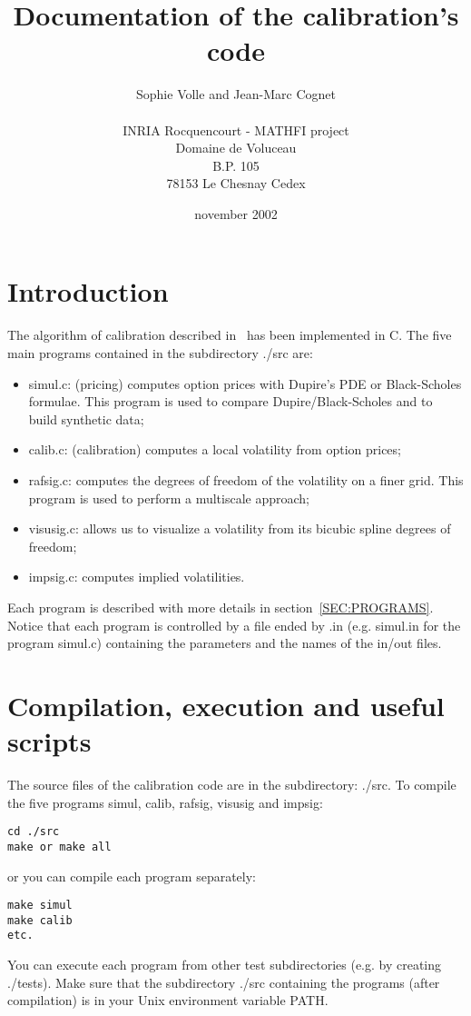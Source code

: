 \documentclass[12pt]{article}
\title{Documentation of the calibration's code}
\author{Sophie Volle and Jean-Marc Cognet \\ \\
INRIA Rocquencourt - MATHFI project \\ 
Domaine de Voluceau \\ 
B.P. 105 \\
78153 Le Chesnay Cedex}
\date{november 2002}
\begin{document}
\maketitle

\tableofcontents
\clearpage

\section{Introduction}

The algorithm of calibration described in~\cite{bcv:inria:02} has 
been implemented in C. The five main programs contained in the 
subdirectory ./src are:
\begin{itemize}
\item 
simul.c: (pricing) computes option prices with Dupire's PDE or 
Black-Scholes formulae. This program is used to compare 
Dupire/Black-Scholes and to build synthetic data;
\item
calib.c: (calibration) computes a local volatility from option 
prices;
\item
rafsig.c: computes the degrees of freedom of the volatility on a finer 
grid. This program is used to perform a multiscale approach;
\item
visusig.c: allows us to visualize a volatility from its bicubic 
spline degrees of freedom;
\item
impsig.c: computes implied volatilities.
\end{itemize}
Each program is described with more details in 
section~\ref{SEC:PROGRAMS}. Notice that each program is controlled 
by a file ended by .in (e.g. simul.in for the program simul.c) 
containing the parameters and the names of the in/out files.

\section{Compilation, execution and useful scripts}

The source files of the calibration code are in the 
subdirectory: ./src. To compile the five programs simul, calib, 
rafsig, visusig and impsig:

\begin{verbatim}
cd ./src
make or make all
\end{verbatim}
or you can compile each program separately:
\begin{verbatim}
make simul
make calib
etc.
\end{verbatim}

You can execute each program from other test subdirectories 
(e.g. by creating ./tests). Make sure that the subdirectory 
./src containing the programs (after compilation) is in 
your Unix environment variable PATH. 
\end{document}

